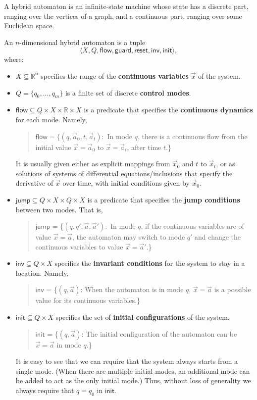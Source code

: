 \documentclass[envcountsect]{llncs}
\newcommand{\flow}{\mathsf{flow}}
\newcommand{\jump}{\mathsf{jump}}
\newcommand{\inv}{\mathsf{inv}}
\newcommand{\init}{\mathsf{init}}
\newcommand{\guard}{\mathsf{guard}}
\newcommand{\reset}{\mathsf{reset}}
\newcommand{\R}{\mathbb{R}}
\begin{document}
A hybrid automaton is an infinite-state machine whose state has a discrete part,
 ranging over the vertices of a graph, and a continuous part, ranging over some
Euclidean space. 
\begin{definition}\label{auto-def}
An $n$-dimensional hybrid automaton is a tuple $$\langle X, Q, \flow,
\guard, \reset, \inv, \init\rangle,$$ where:
\begin{itemize}
\item $X\subseteq \mathbb{R}^n$ specifies the range of the {\bf continuous
variables}  $\vec x$ of the system. 
\item $Q=\{q_0,...,q_m\}$ is a finite set of discrete {\bf control modes}. 
\item $\flow \subseteq Q\times X\times \R \times X$ is a predicate that
specifies  the {\bf continuous dynamics} for each mode. Namely, 
\begin{quote}
$\flow = \{(q, \vec a_0, t, \vec a_t):$ In mode $q$, there is a continuous flow 
from the initial value $\vec x = \vec a_0$ to $\vec x = \vec a_t$, after time
$t$.\}
\end{quote}
It is usually given either as explicit mappings from $\vec x_0$ and $t$ to $\vec
x_t$,  or as solutions of systems of differential equations/inclusions that
specify the derivative of $\vec x$ over time, with initial conditions given by
$\vec x_0$. 

\item $\jump\subseteq Q\times X\times Q\times X$ is a predicate that specifies 
the {\bf jump conditions} between two modes. That is,  
\begin{quote}
$\jump$ = \{$(q,q',\vec a,\vec a'):$ In mode $q$, if the continuous variables 
are of value $\vec x = \vec a$, the automaton may switch to mode $q'$ and change
the continuous variables to value $\vec x = \vec a'$.\}
\end{quote}

\item $\inv \subseteq Q\times X$ specifies the {\bf invariant conditions} for 
the system to stay in a location. Namely,
\begin{quote}
$\inv$ = \{$(q,\vec a)$: When the automaton is in mode $q$, $\vec x = \vec a$ 
is a possible value for its continuous variables.\}
\end{quote}

\item $\init \subseteq Q\times X$ specifies the set of {\bf initial
configurations}  of the system. 
\begin{quote}
$\init$ = \{$(q, \vec a)$: The initial configuration of the automaton can be 
$\vec x = \vec a$ in mode $q$.\}
\end{quote}
It is easy to see that we can require that the system always starts from a
single mode.  (When there are multiple initial modes, an additional mode can be
added to act as the only initial mode.) Thus, without loss of generality we
always require that $q=q_0$ in $\init$. 
\end{itemize}
\end{definition}
\end{document}
